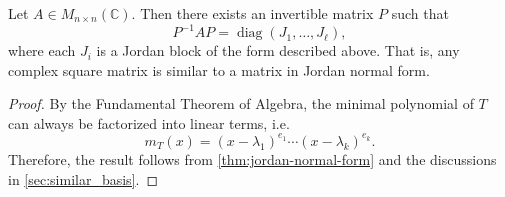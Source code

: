 \begin{corollary}
\label{cor:jordan-c-complete}
Let \( A \in M_{n \times n}(\mathbb{C}) \). Then there exists an invertible matrix \( P \) such that
\[
P^{-1} A P = \operatorname{diag}(J_1, \ldots, J_\ell),
\]
where each \( J_i \) is a Jordan block of the form described above. That is, any complex square matrix is similar to a matrix in Jordan normal form.
\end{corollary}
\begin{proof}
    By the Fundamental Theorem of Algebra, the minimal polynomial of $T$ can always be factorized into linear terms, i.e.
    $$m_{T}(x) = (x-\lambda_1)^{e_1} \cdots (x-\lambda_k)^{e_k}.$$
    Therefore, the result follows from \autoref{thm:jordan-normal-form} and the discussions in \autoref{sec:similar_basis}.
\end{proof}

